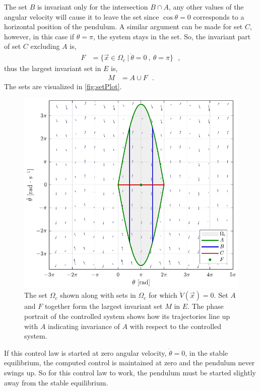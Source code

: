 %
%
The set $B$ is invariant only for the intersection $B \cap A$, any other values of the angular velocity will cause it to leave the set since $\cos \theta = 0$ corresponds to a horizontal position of the pendulum. A similar argument can be made for set $C$, however, in this case if $\theta = \pi$, the system stays in the set. So, the invariant part of set $C$ excluding $A$ is,
\begin{align}
  F &=  \{ \vec{x} \in \Omega_c \ | \ \dot{\theta} = 0 \ , \ \theta = \pi \}  \ \ \ ,  \label{eq:F}
\end{align}
thus the largest invariant set in $E$ is,
\begin{align}
M &= A \cup F \ \ \ .  \label{eq:M}
\end{align}
%
The sets are visualized in \autoref{fig:setPlot}.
\begin{figure}[H]
  \includegraphics[width=.65\textwidth]{figures/setPlot}
  \caption{The set $\Omega_c$ shown along with sets in $\Omega_c$ for which $\dot{V}(\vec{x}) = 0$. Set $A$ and $F$ together form the largest invariant set $M$ in $E$. The phase portrait of the controlled system shows how its trajectories line up with $A$ indicating invariance of $A$ with respect to the controlled system.}
  \label{fig:setPlot}
\end{figure}
%
If this control law is started at zero angular velocity, $\dot{\theta} = 0$, in the stable equilibrium, the computed control is maintained at zero and the pendulum never swings up. So for this control law to work, the pendulum must be started slightly away from the stable equilibrium.

